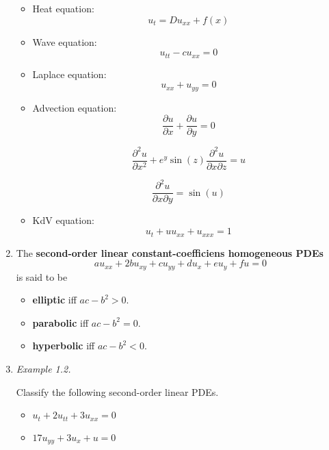 \begin{enumerate}
\begin{itemize}
    \item {Heat equation:} 
    \[u_{t} = D u_{xx} + f(x)\]
    \vspace{20pt}

    \item {Wave equation:}
    \[u_{tt} - c u_{xx} =0 \]
    \vspace{20pt}

    \item {Laplace equation:}
    \[u_{xx} + u_{yy} = 0 \]
    \vspace{20pt}

    \item {Advection equation:}
    \[ \frac{\partial u}{\partial x}+ \frac{\partial u}{\partial y} = 0\]
    \vspace{20pt}

    \[ \frac{\partial^{2} u}{\partial x^{2}}+ e^{y}\sin(z)\frac{\partial^{2} u}{\partial x \partial z} = u\]
    \vspace{40pt}

    \[ \frac{\partial^{2} u}{\partial x \partial y} = \sin(u)\]
    \vspace{20pt}
    \item {KdV equation:} \[u_{t} + uu_{xx} + u_{xxx} =1\]
    \vspace{20pt}
\end{itemize}


\newpage

\item The \textbf{second-order linear constant-coefficiens homogeneous PDEs}
\[au_{xx}+2bu_{xy}+cu_{yy}+du_{x}+eu_{y}+fu=0\]
is said to be
\begin{itemize}
    \item \textbf{elliptic} iff $ac-b^{2}>0$.
    \item \textbf{parabolic} iff $ac-b^{2}=0$.
    \item \textbf{hyperbolic} iff $ac-b^{2}<0$.
\end{itemize}

\item \textit{Example 1.2.} 

Classify the following second-order linear PDEs.
\begin{itemize}
    \item $u _{t} + 2u _{tt} + 3u _{xx} = 0$
    \vspace{100pt}

    \item $17u_{ yy} + 3u _{x} + u = 0$
    \vspace{100pt}


\end{itemize}
\end{enumerate}
